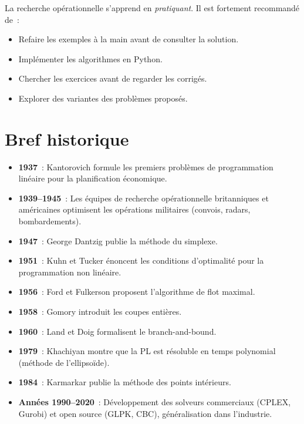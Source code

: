 \begin{bonnepratique}[title=\textbf{Apprentissage actif}]
La recherche op\'erationnelle s'apprend en \textit{pratiquant}. Il est fortement
recommand\'e de~:
\begin{itemize}
  \item Refaire les exemples \`a la main avant de consulter la solution.
  \item Impl\'ementer les algorithmes en Python.
  \item Chercher les exercices avant de regarder les corrig\'es.
  \item Explorer des variantes des probl\`emes propos\'es.
\end{itemize}
\end{bonnepratique}

\section*{Bref historique}

\begin{itemize}
  \item \textbf{1937}~: Kantorovich formule les premiers probl\`emes de
        programmation lin\'eaire pour la planification \'economique.
  \item \textbf{1939--1945}~: Les \'equipes de recherche op\'erationnelle
        britanniques et am\'ericaines optimisent les op\'erations militaires
        (convois, radars, bombardements).
  \item \textbf{1947}~: George Dantzig publie la m\'ethode du simplexe.
  \item \textbf{1951}~: Kuhn et Tucker \'enoncent les conditions d'optimalit\'e
        pour la programmation non lin\'eaire.
  \item \textbf{1956}~: Ford et Fulkerson proposent l'algorithme de flot
        maximal.
  \item \textbf{1958}~: Gomory introduit les coupes enti\`eres.
  \item \textbf{1960}~: Land et Doig formalisent le branch-and-bound.
  \item \textbf{1979}~: Khachiyan montre que la PL est r\'esoluble en temps
        polynomial (m\'ethode de l'ellipso\"ide).
  \item \textbf{1984}~: Karmarkar publie la m\'ethode des points int\'erieurs.
  \item \textbf{Ann\'ees 1990--2020}~: D\'eveloppement des solveurs commerciaux
        (CPLEX, Gurobi) et open source (GLPK, CBC), g\'en\'eralisation dans
        l'industrie.
\end{itemize}

